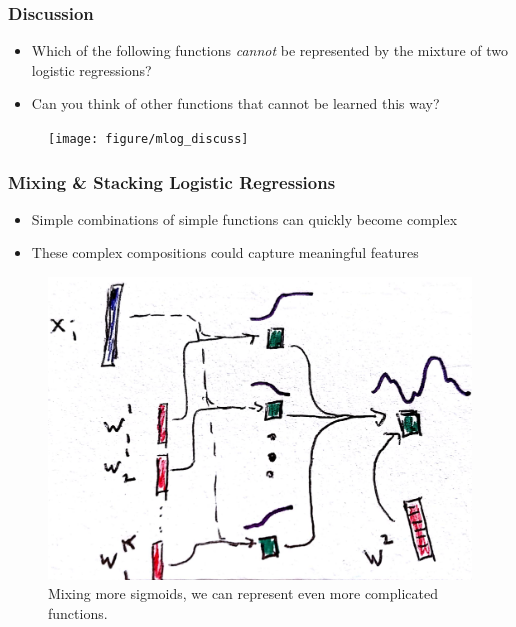 \documentclass[10pt,mathserif]{beamer}
\begin{document}
\begin{frame}
  \frametitle{Discussion}
  \begin{itemize}
  \item Which of the following functions \textit{cannot} be represented by the
    mixture of two logistic regressions?
  \item Can you think of other functions that cannot be learned this way?
  \end{itemize}
  \begin{figure}[ht]
    \centering
    \texttt{[image: figure/mlog\_discuss]}
  \end{figure}
\end{frame}

\begin{frame}
  \frametitle{Mixing \& Stacking Logistic Regressions}
  \begin{itemize}
  \item Simple combinations of simple functions can quickly become complex
  \item These complex compositions could capture meaningful features
  \end{itemize}
  \begin{figure}
    \centering
    \includegraphics[width=0.55\paperwidth]{figure/mixture_logistic_k}
    \caption{Mixing more sigmoids, we can represent even more complicated
      functions. \label{fig:mixture_logistic_k} }
  \end{figure}
\end{frame}
\end{document}
